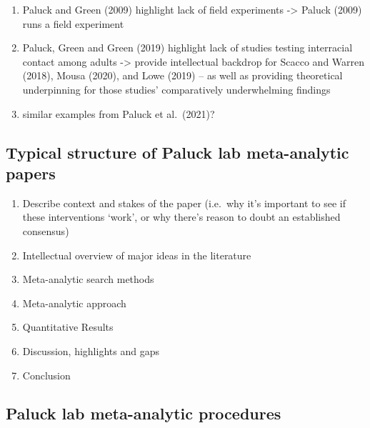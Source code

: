 \documentclass[
  man]{apa6}
\providecommand{\tightlist}{%
  \setlength{\itemsep}{0pt}\setlength{\parskip}{0pt}}
\begin{document}
\begin{enumerate}
\begin{enumerate}
    \begin{enumerate}
    \def\labelenumiii{\arabic{enumiii}.}
    \tightlist
    \item
      Paluck and Green (2009) highlight lack of field experiments -\textgreater{} Paluck (2009) runs a field experiment
    \item
      Paluck, Green and Green (2019) highlight lack of studies testing interracial contact among adults -\textgreater{} provide intellectual backdrop for Scacco and Warren (2018), Mousa (2020), and Lowe (2019) -- as well as providing theoretical underpinning for those studies' comparatively underwhelming findings
    \item
      similar examples from Paluck et al.~(2021)?
    \end{enumerate}
  \end{enumerate}
\end{enumerate}

\subsection{Typical structure of Paluck lab meta-analytic papers}\label{typical-structure-of-paluck-lab-meta-analytic-papers}

\begin{enumerate}
\def\labelenumi{\arabic{enumi}.}
\tightlist
\item
  Describe context and stakes of the paper (i.e.~why it's important to see if these interventions `work', or why there's reason to doubt an established consensus)
\item
  Intellectual overview of major ideas in the literature
\item
  Meta-analytic search methods
\item
  Meta-analytic approach
\item
  Quantitative Results
\item
  Discussion, highlights and gaps
\item
  Conclusion
\end{enumerate}

\subsection{Paluck lab meta-analytic procedures}\label{paluck-lab-meta-analytic-procedures}
\end{document}
